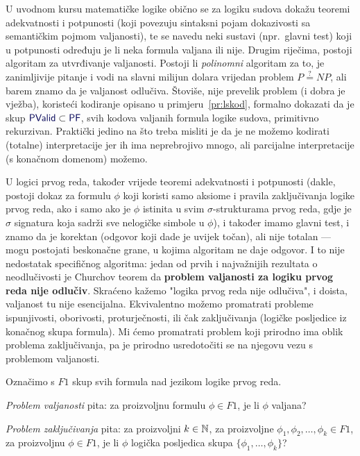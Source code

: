 U uvodnom kursu matematičke logike obično se za logiku sudova dokažu teoremi adekvatnosti i potpunosti (koji povezuju sintaksni pojam dokazivosti sa semantičkim pojmom valjanosti), te se navedu neki sustavi (npr.\ glavni test) koji u potpunosti određuju je li neka formula valjana ili nije. Drugim riječima, postoji algoritam za utvrđivanje valjanosti. Postoji li \emph{polinomni} algoritam za to, je zanimljivije pitanje i vodi na slavni milijun dolara vrijedan problem $P\stackrel?=NP$, ali barem znamo da je valjanost odlučiva. Štoviše, nije prevelik problem (i dobra je vježba), koristeći kodiranje opisano u primjeru~\ref{pr:lskod}, formalno dokazati da je skup $\f{PValid}\subset\f{PF}$, svih kodova valjanih formula logike sudova, primitivno rekurzivan. Praktički jedino na što treba misliti je da je ne možemo kodirati (totalne) interpretacije jer ih ima neprebrojivo mnogo, ali parcijalne interpretacije (s konačnom domenom) možemo.

U logici prvog reda, također vrijede teoremi adekvatnosti i potpunosti (dakle, postoji dokaz za formulu $\phi$ koji koristi samo aksiome i pravila zaključivanja logike prvog reda, ako i samo ako je $\phi$ istinita u svim $\sigma$-strukturama prvog reda, gdje je $\sigma$ signatura koja sadrži sve nelogičke simbole u $\phi$), i također imamo glavni test, i znamo da je korektan (odgovor koji dade je uvijek točan), ali nije totalan --- mogu postojati beskonačne grane, u kojima algoritam ne daje odgovor. I to nije nedostatak specifičnog algoritma: jedan od prvih i najvažnijih rezultata o neodlučivosti je Churchov teorem da \textbf{problem valjanosti za logiku prvog reda nije odlučiv}. Skraćeno kažemo "logika prvog reda nije odlučiva", i doista, valjanost tu nije esencijalna. Ekvivalentno možemo promatrati probleme ispunjivosti, oborivosti, proturječnosti, ili čak zaključivanja (logičke posljedice iz konačnog skupa formula). Mi ćemo promatrati problem koji prirodno ima oblik problema zaključivanja, pa je prirodno usredotočiti se na njegovu vezu s problemom valjanosti.

\begin{definicija}[{name=[problem valjanosti i problem zaključivanja]}]
Označimo s $F1$ skup svih formula nad jezikom logike prvog reda.

\emph{Problem valjanosti} pita: za proizvoljnu formulu $\phi\in F1$, je li $\phi$ valjana?

\emph{Problem zaključivanja} pita: za proizvoljni $k\in{\mathbb N}$, za proizvoljne $\phi_1,\phi_2,\dotsc,\phi_k\in F1$, za proizvoljnu $\phi\in F1$, je li $\phi$ logička posljedica skupa $\{\phi_1,\dotsc,\phi_k\}$?
\end{definicija}

